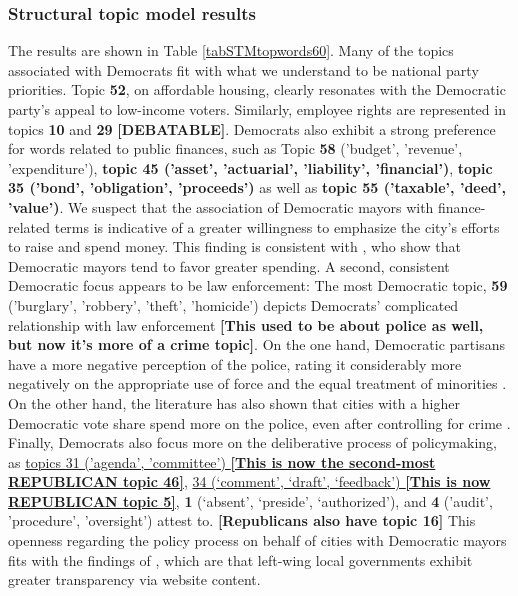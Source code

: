 \documentclass[11pt]{article}
\begin{document}
\subsubsection{Structural topic model results}


The results are shown in Table \ref{tabSTMtopwords60}. Many of the topics associated with Democrats fit with what we understand to be national party priorities. Topic \textbf{52}, on affordable housing, clearly resonates with the Democratic party's appeal to low-income voters. Similarly, employee rights are represented in topics \textbf{10} and \textbf{29} \textbf{[DEBATABLE]}. Democrats also exhibit a strong preference for words related to public finances, such as Topic \textbf{58} ('budget', 'revenue', 'expenditure'), \textbf{topic 45 ('asset', 'actuarial', 'liability', 'financial')}, \textbf{topic 35 ('bond', 'obligation', 'proceeds')} as well as \textbf{topic 55 ('taxable', 'deed', 'value')}. We suspect that the association of Democratic mayors with finance-related terms is indicative of a greater willingness to emphasize the city's efforts to raise and spend money. This finding is consistent with \citep{Einstein2015}, who show that Democratic mayors tend to favor greater spending. A second, consistent Democratic focus appears to be law enforcement: The most Democratic topic, \textbf{59} ('burglary', 'robbery', 'theft', 'homicide') depicts Democrats' complicated relationship with law enforcement \textbf{[This used to be about police as well, but now it's more of a crime topic]}. On the one hand, Democratic partisans have a more negative perception of the police, rating it considerably more negatively on the appropriate use of force and the equal treatment of minorities \citep{Brown2017}. On the other hand, the literature has also shown that cities with a higher Democratic vote share spend more on the police, even after controlling for crime \citep{Einstein2015}. Finally, Democrats also focus more on the deliberative process of policymaking, as \underline{topics 31 ('agenda', 'committee') \textbf{[This is now the second-most REPUBLICAN topic 46]}}, \underline{34 (`comment', `draft', `feedback') \textbf{[This is now REPUBLICAN topic 5]}}, \textbf{1} (`absent', `preside', `authorized'), and \textbf{4} ('audit', 'procedure', 'oversight') attest to. \textbf{[Republicans also have topic 16]}  This openness regarding the policy process on behalf of cities with Democratic mayors fits with the findings of \citet{grimmelikhuijsen2012developing}, which are that left-wing local governments exhibit greater transparency via website content.
\end{document}
